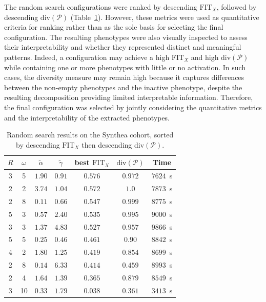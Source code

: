 \documentclass[pdflatex,sn-mathphys-num,referee,lineno]{sn-jnl}
\begin{document}
The random search configurations were ranked by descending $\text{FIT}_X$, followed by descending $\text{div}(\mathcal{P})$ (Table~\ref{tab:results_synthea}). 
However, these metrics were used as quantitative criteria for ranking rather than as the sole basis for selecting the final configuration. 
The resulting phenotypes were also visually inspected to assess their interpretability and whether they represented distinct and meaningful patterns. 
Indeed, a configuration may achieve a high $\text{FIT}_X$ and high $\text{div}(\mathcal{P})$ while containing one or more phenotypes with little or no activation. 
In such cases, the diversity measure may remain high because it captures differences between the non-empty phenotypes and the inactive phenotype, despite the resulting decomposition providing limited interpretable information. 
Therefore, the final configuration was selected by jointly considering the quantitative metrics and the interpretability of the extracted phenotypes.
\begin{table}[htbp]
\centering
\caption{Random search results on the Synthea cohort, sorted by descending $\text{FIT}_X$ then descending $\text{div}(\mathcal{P})$.}
\label{tab:results_synthea}
\begin{tabular}{ccccccc}
\toprule
$R$ & $\omega$ & $\tilde{\alpha}$ & $\tilde{\gamma}$ & best $\text{FIT}_X$ & $\text{div}(\mathcal{P})$ & Time \\
\midrule
3 & 5 & $1.90$ & $0.91$ & $0.576$ & $0.972$ & $7 624$~s \\
2 & 2 & $3.74$ & $1.04$ & $0.572$ & $1.0$ & $7 873$~s \\
2 & 8 & $0.11$ & $0.66$ & $0.547$ & $0.999$ & $8 775$~s \\
5 & 3 & $0.57$ & $2.40$ & $0.535$ & $0.995$ & $9 000$~s \\
3 & 3 & $1.37$ & $4.83$ & $0.527$ & $0.957$ & $9 866$~s \\
5 & 5 & $0.25$ & $0.46$ & $0.461$ & $0.90$ & $8 842$~s \\
4 & 2 & $1.80$ & $1.25$ & $0.419$ & $0.854$ & $8 699$~s \\
2 & 8 & $0.14$ & $6.33$ & $0.414$ & $0.459$ & $8 993$~s \\
2 & 4 & $1.64$ & $1.39$ & $0.365$ & $0.879$ & $8 549$~s \\
3 & 10 & $0.33$ & $1.79$ & $0.038$ & $0.361$ & $3 413$~s \\
\bottomrule
\end{tabular}
\end{table}
\end{document}
